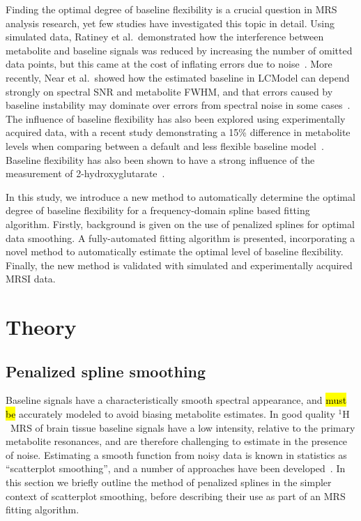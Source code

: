 \documentclass[num-refs]{wiley-article}
\newcommand{\proton}{\ensuremath{^1\mathrm{H}}}
\newcommand{\revone}[2]{\hl{#1}\marginnote{\hl{#2}}}
\begin{document}
Finding the optimal degree of baseline flexibility is a crucial question in MRS analysis research, yet few studies have investigated this topic in detail. Using simulated data, Ratiney et al.\ demonstrated how the interference between metabolite and baseline signals was reduced by increasing the number of omitted data points, but this came at the cost of inflating errors due to noise~\cite{Ratiney2004}. More recently, Near et al.\ showed how the estimated baseline in LCModel can depend strongly on spectral SNR and metabolite FWHM, and that errors caused by baseline instability may dominate over errors from spectral noise in some cases~\cite{Near2013}. The influence of baseline flexibility has also been explored using experimentally acquired data, with a recent study demonstrating a 15\% difference in metabolite levels when comparing between a default and less flexible baseline model~\cite{Giapitzakis2019}. Baseline flexibility has also been shown to have a strong influence of the measurement of 2-hydroxyglutarate~\cite{Wenger2019}.

In this study, we introduce a new method to automatically determine the optimal degree of baseline flexibility for a frequency-domain spline based fitting algorithm. Firstly, background is given on the use of penalized splines for optimal data smoothing. A fully-automated fitting algorithm is presented, incorporating a novel method to automatically estimate the optimal level of baseline flexibility. Finally, the new method is validated with simulated and experimentally acquired MRSI data.

\section{Theory}
\subsection{Penalized spline smoothing}

Baseline signals have a characteristically smooth spectral appearance, and \revone{must be}{R1.5} accurately modeled to avoid biasing metabolite estimates. In good quality \proton\ MRS of brain tissue baseline signals have a low intensity, relative to the primary metabolite resonances, and are therefore challenging to estimate in the presence of noise. Estimating a smooth function from noisy data is known in statistics as ``scatterplot smoothing'', and a number of approaches have been developed~\cite{Ruppert2003}. In this section we briefly outline the method of penalized splines in the simpler context of scatterplot smoothing, before describing their use as part of an MRS fitting algorithm.
\end{document}
